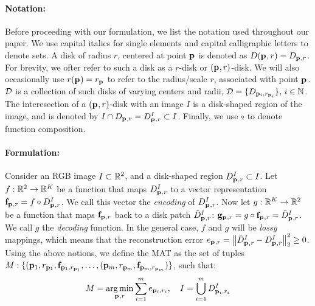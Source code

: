 \documentclass[10pt,twocolumn,letterpaper]{article}
\begin{document}
\paragraph{Notation:} Before proceeding with our formulation, we list the notation used throughout our paper.
We use capital italics for single elements and capital calligraphic letters to denote sets. A disk of radius $r$,
centered at point $\mathbf{p}_{}$ is denoted as $D(\mathbf{p}_{},r)=D_{\mathbf{p}_{},r}$. 
For brevity, we ofter refer to such a disk as a $r$-disk or $(\mathbf{p}_{},r)$-disk.
We will also occasionally use $r(\mathbf{p}_{}) = r_{\mathbf{p}_{}}$ to refer to the radius/scale $r$, associated with point $\mathbf{p}_{}$.
$\mathcal{D}$ is a collection of such disks of varying centers and radii, $\mathcal{D}=\{ D_{\mathbf{p}_{i},r_{\mathbf{p}_{i}}} \},\, i\in\mathbb{N}$.
The interesection of a $(\mathbf{p}_{},r)$-disk with an image $I$ is a disk-shaped region of the image, and is denoted by 
$I \cap D_{\mathbf{p}_{},r}=D_{\mathbf{p}_{},r}^I \subset I$. Finally, we use $\circ$ to denote function composition.

\paragraph{Formulation:} Consider an RGB image $I\subset\mathbb{R}^2$, and a disk-shaped region $D_{\mathbf{p}_{},r}^I \subset I$.
Let $f:\mathbb{R}^2 \rightarrow \mathbb{R}^K$ be a function that maps $D_{\mathbf{p}_{},r}^I$ to a vector representation $\mathbf{f}_{\mathbf{p}_{},r}=f\circ D_{\mathbf{p}_{},r}^I$. 
We call this vector the \emph{encoding} of $D_{\mathbf{p}_{},r}^I$. 
Now let $g:\mathbb{R}^K \rightarrow \mathbb{R}^2$ be a function that maps $\mathbf{f}_{\mathbf{p}_{},r}$ back to a disk patch $\tilde{D}_{\mathbf{p}_{},r}^I$: 
$\mathbf{g}_{\mathbf{p}_{},r} = g \circ \mathbf{f}_{\mathbf{p}_{},r} = \tilde{D}_{\mathbf{p}_{},r}^I$. We call $g$ the \emph{decoding} function.
In the general case, $f$ and $g$ will be \emph{lossy} mappings, which means that the reconstruction error 
$e_{\mathbf{p}_{},r} = \left \lVert  \tilde{D}_{\mathbf{p}_{},r}^I - D_{\mathbf{p}_{},r}^I \right \rVert_2^2 \geq 0$. 
Using the above notions, we define the MAT as the set of tuples 
$M:\{ ( \mathbf{p}_{1},r_{\mathbf{p}_{1}}, \mathbf{f}_{\mathbf{p}_{1},r_{\mathbf{p}_{1}}}, \ldots, ( \mathbf{p}_{m},r_{\mathbf{p}_{m}}, \mathbf{f}_{\mathbf{p}_{m},r_{\mathbf{p}_{m}}} ) \}$, such that:
\begin{equation}
M = \operatorname*{arg\,min}_{\mathbf{p}_{},r}{\sum_{i=1}^m e_{\mathbf{p}_{i},r_i}},\quad I=\bigcup_{i=1}^m D_{\mathbf{p}_{i},r_i}^I 
\label{eq:minimization}
\end{equation}
\end{document}
